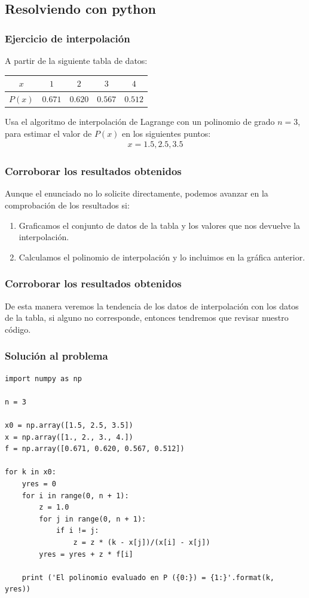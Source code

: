 \documentclass[12pt]{beamer}
\begin{document}
\subsection{Resolviendo con python}

\begin{frame}
\frametitle{Ejercicio de interpolación}
A partir de la siguiente tabla de datos:
\pause
\begin{center}
\renewcommand{\arraystretch}{0.9}
\begin{tabular}{c | c | c | c | c}
$x$ & $1$ & $2$ & $3$ & $4$ \\ \hline
$P (x)$ & $0.671$ & $0.620$ & $0.567$ & $0.512$ \\
\end{tabular}
\end{center}
\pause
Usa el algoritmo de interpolación de Lagrange con un polinomio de grado $n = 3$, para estimar el valor de $P (x)$ en los siguientes puntos:
\begin{align*}
x = 1.5, 2.5, 3.5
\end{align*}
\end{frame}
\begin{frame}
\frametitle{Corroborar los resultados obtenidos}
Aunque el enunciado no lo solicite directamente, podemos avanzar en la comprobación de los resultados si:
\begin{enumerate}[<+->]
\item Graficamos el conjunto de datos de la tabla y los valores que nos devuelve la interpolación.
\item Calculamos el polinomio de interpolación y lo incluimos en la gráfica anterior.
\end{enumerate}
\end{frame}
\begin{frame}
\frametitle{Corroborar los resultados obtenidos}
De esta manera veremos la tendencia de los datos de interpolación con los datos de la tabla, si alguno no corresponde, entonces tendremos que revisar nuestro código.
\end{frame}
\begin{frame}
\frametitle{Solución al problema}
\begin{lstlisting}[caption=Código para la interpolación de Lagrange]
import numpy as np

n = 3

x0 = np.array([1.5, 2.5, 3.5])
x = np.array([1., 2., 3., 4.])
f = np.array([0.671, 0.620, 0.567, 0.512])

for k in x0:
    yres = 0
    for i in range(0, n + 1):
        z = 1.0
        for j in range(0, n + 1):
            if i != j:
                z = z * (k - x[j])/(x[i] - x[j])
        yres = yres + z * f[i] 
    
    print ('El polinomio evaluado en P ({0:}) = {1:}'.format(k,  yres))
\end{lstlisting}
\end{frame}
\end{document}
